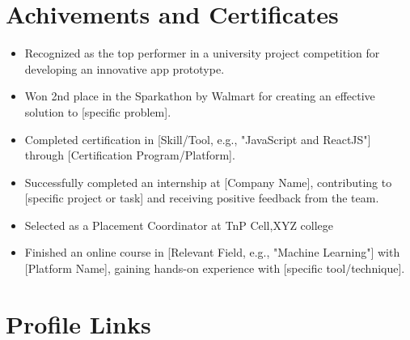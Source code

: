 \documentclass[a4paper,11pt]{article}
\newcommand{\resumeSubHeadingListStart}{\begin{itemize}[leftmargin=*,labelsep=0mm]}
\newcommand{\resumeItemListStart}{\begin{justify}\begin{itemize}[leftmargin=3ex, rightmargin=2ex, noitemsep,labelsep=1.2mm,itemsep=0mm]\small}
\newcommand{\resumeSubHeadingListEnd}{\end{itemize}\vspace{2mm}}
\newcommand{\resumeItemListEnd}{\end{itemize}\end{justify}\vspace{-2mm}}
\begin{document}
\section{\textbf{Achivements and Certificates}}
\resumeSubHeadingListStart
    \resumeItemListStart
            \item{Recognized as the top performer in a university project competition for developing an innovative app prototype.}
            \vspace{0.4mm}
             \item{ Won 2nd place in the Sparkathon by Walmart for creating an effective solution to [specific problem].}
             \vspace{0.4mm}
             \item{Completed certification in [Skill/Tool, e.g., "JavaScript and ReactJS"] through [Certification Program/Platform].}
    	\item{Successfully completed an internship at [Company Name], contributing to [specific project or task] and receiving positive feedback from the team.}
            \vspace{0.4mm}
            \item {Selected as a Placement Coordinator at TnP Cell,XYZ college}
            \vspace{0.4mm}
            \item{Finished an online course in [Relevant Field, e.g., "Machine Learning"] with [Platform Name], gaining hands-on experience with [specific tool/technique].}
    \resumeItemListEnd
\resumeSubHeadingListEnd
\vspace{-5.6mm}

\section{\textbf{Profile Links}}
\newcommand{\profileLink}[2]{%
  \hspace{0.1cm}\raisebox{0.2ex}{\tiny$\bullet$}\underline{\href{#1}{#2}\par}}
 \vspace{1.0mm}

\end{document}
